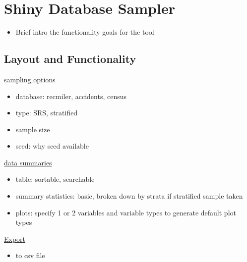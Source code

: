 \documentclass{article}\usepackage[]{graphicx}\usepackage[]{color}
\begin{document}

\section{Shiny Database Sampler}
\begin{itemize}
\item Brief intro the functionality goals for the tool
\end{itemize}

\subsection{Layout and Functionality}

\underline{sampling options}
\begin{itemize}
\item database: recmiler, accidents, census
\item type: SRS, stratified
\item sample size
\item seed: why seed available
\end{itemize}

\vspace{.1in}

\underline{data summaries}
\begin{itemize}
\item table: sortable, searchable
\item summary statistics: basic, broken down by strata if stratified sample taken
\item plots: specify 1 or 2 variables and variable types to generate default plot types
\end{itemize}

\vspace{.1in}

\underline{Export}
\begin{itemize}
\item to csv file
\end{itemize}
\end{document}
